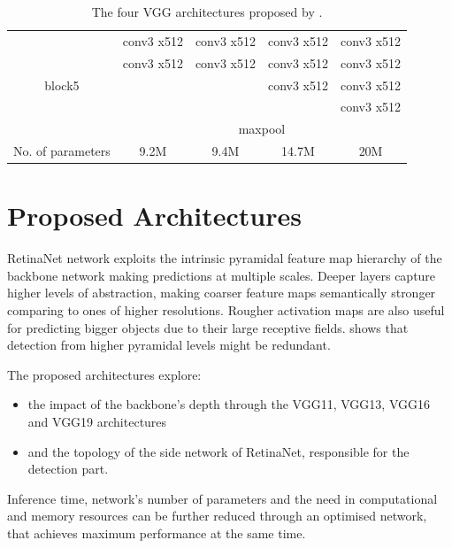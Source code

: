 \begin{table}[!h]
{\begin{tabular}{c|cccc}
  \hline
  \multirow{5}{*}{block5}	&	conv3 x512	&	conv3 x512	&	conv3 x512	&	conv3 x512	\\
  					&	conv3 x512	&	conv3 x512	&	conv3 x512	&	conv3 x512	\\
  					&				&				&	conv3 x512	&	conv3 x512	\\
  					&				&				&				&	conv3 x512	 \\
  \cmidrule{2-5}
  					&	\multicolumn{4}{c}{maxpool}	\\
  \hline
  No. of parameters		&	9.2M			&	9.4M			&	14.7M		&	20M			\\
  \bottomrule
  \end{tabular}
  }
  \caption{The four VGG architectures proposed by \cite{simonyan2014very}.}
  \label{ch4:tab2}
\end{table}
\vfill
 
\section{Proposed Architectures}
RetinaNet network exploits the intrinsic pyramidal feature map hierarchy of the backbone network making predictions at multiple scales. Deeper layers capture higher levels of abstraction, making coarser feature maps semantically stronger comparing to ones of higher resolutions. Rougher activation maps are also useful for predicting bigger objects due to their large receptive fields.  shows that detection from higher pyramidal levels might be redundant. 

The proposed architectures explore:
\begin{itemize}
 \item the impact of the backbone's depth through the VGG11, VGG13, VGG16 and VGG19 architectures
 \item and the topology of the side network of RetinaNet, responsible for the detection part.
\end{itemize}

Inference time, network's number of parameters and the need in computational and memory resources can be further reduced through an optimised network, that achieves maximum performance at the same time.

